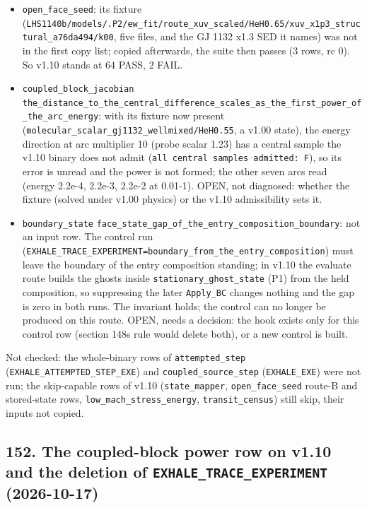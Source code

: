 \documentclass[english,a4paper]{my_memo}
\providecommand{\tightlist}{\setlength{\itemsep}{0pt}\setlength{\parskip}{0pt}}
\begin{document}
\begin{itemize}
\tightlist
\item
  \texttt{open\_face\_seed}: its fixture (\texttt{LHS1140b/models/.P2/ew\_fit/route\_xuv\_scaled/HeH0.65/xuv\_x1p3\_structural\_a76da494/k00}, five files, and the GJ 1132 x1.3 SED it names) was not in the first copy list; copied afterwards, the suite then passes (3 rows, rc 0). So v1.10 stands at 64 PASS, 2 FAIL.
\item
  \texttt{coupled\_block\_jacobian} \texttt{the\_distance\_to\_the\_central\_difference\_scales\_as\_the\_first\_power\_of\_the\_arc\_energy}: with its fixture now present (\texttt{molecular\_scalar\_gj1132\_wellmixed/HeH0.55}, a v1.00 state), the energy direction at arc multiplier 10 (probe scalar 1.23) has a central sample the v1.10 binary does not admit (\texttt{all\ central\ samples\ admitted:\ F}), so its error is unread and the power is not formed; the other seven arcs read (energy 2.2e-4, 2.2e-3, 2.2e-2 at 0.01-1). OPEN, not diagnosed: whether the fixture (solved under v1.00 physics) or the v1.10 admissibility sets it.
\item
  \texttt{boundary\_state} \texttt{face\_state\_gap\_of\_the\_entry\_composition\_boundary}: not an input row. The control run (\texttt{EXHALE\_TRACE\_EXPERIMENT=boundary\_from\_the\_entry\_composition}) must leave the boundary of the entry composition standing; in v1.10 the evaluate route builds the ghosts inside \texttt{stationary\_ghost\_state} (P1) from the held composition, so suppressing the later \texttt{Apply\_BC} changes nothing and the gap is zero in both runs. The invariant holds; the control can no longer be produced on this route. OPEN, needs a decision: the hook exists only for this control row (section 148\textquotesingle s rule would delete both), or a new control is built.
\end{itemize}

Not checked: the whole-binary rows of \texttt{attempted\_step} (\texttt{EXHALE\_ATTEMPTED\_STEP\_EXE}) and \texttt{coupled\_source\_step} (\texttt{EXHALE\_EXE}) were not run; the skip-capable rows of v1.10 (\texttt{state\_mapper}, \texttt{open\_face\_seed} route-B and stored-state rows, \texttt{low\_mach\_stress\_energy}, \texttt{transit\_census}) still skip, their inputs not copied.

\subsection{\texorpdfstring{152. The coupled-block power row on v1.10 and the deletion of \texttt{EXHALE\_TRACE\_EXPERIMENT} (2026-10-17)}{152. The coupled-block power row on v1.10 and the deletion of EXHALE\_TRACE\_EXPERIMENT (2026-10-17)}}\label{152-the-coupled-block-power-row-on-v110-and-the-deletion-of-exhale_trace_experiment-2026-10-17}
\end{document}

